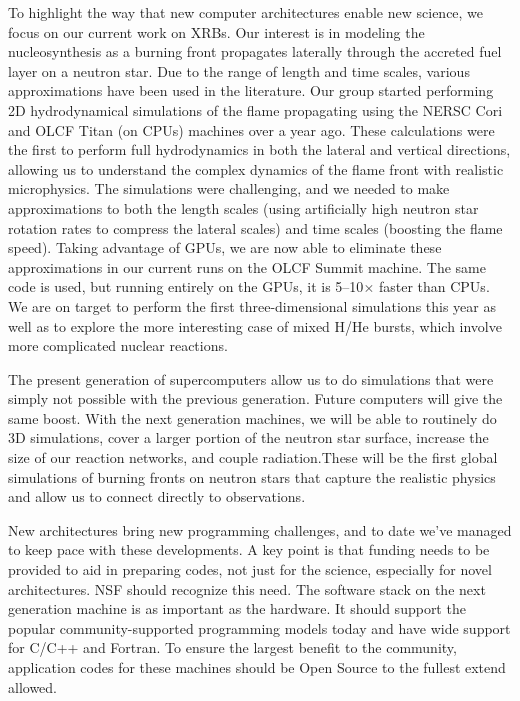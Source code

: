 \documentclass[11pt]{article}
\begin{document}
To highlight the way that new computer architectures enable new
science, we focus on our current work on XRBs.  Our interest is in
modeling the nucleosynthesis as a burning front propagates laterally
through the accreted fuel layer on a neutron star.  Due to the range
of length and time scales, various approximations have been used in the
literature.  Our group started performing 2D
hydrodynamical simulations of the flame propagating using the NERSC
Cori and OLCF Titan (on CPUs)  machines over a year ago.  These calculations were
the first to perform full hydrodynamics in both the lateral and
vertical directions, allowing us to understand the complex dynamics of
the flame front with realistic microphysics.  The simulations were
challenging, and we needed to make approximations to both the length
scales (using artificially high neutron star rotation rates to compress
the lateral scales) and time scales (boosting the flame speed).
  Taking advantage of GPUs,
we are now able to eliminate these approximations in our current runs on the
OLCF Summit machine.  The same code is used,
but running entirely on the GPUs, it is 5--10$\times$ faster than
CPUs.  We are on target to perform the first three-dimensional
simulations this year as well as to explore the more interesting case
of mixed H/He bursts, which involve more complicated nuclear
reactions.

The present generation of supercomputers allow us to do simulations
that were simply not possible with the previous generation.  Future
computers will give the same boost.  With the next generation
machines, we will be able to routinely do 3D simulations, cover a
larger portion of the neutron star surface, increase the size of our
reaction networks, and couple radiation.These will be the first global
simulations of burning fronts on neutron stars that capture the
realistic physics and allow us to connect directly to observations.

New architectures bring new programming challenges, and to date we've
managed to keep pace with these developments.  A key point is that
funding needs to be provided to aid in preparing codes, not just for
the science, especially for novel architectures.  NSF should recognize
this need.  The software stack on the next generation machine is as
important as the hardware.  It should support the popular
community-supported programming models today and have wide support for
C/C++ and Fortran.  To ensure the largest benefit to the community,
application codes for these machines should be Open Source to the
fullest extend allowed.
\end{document}
